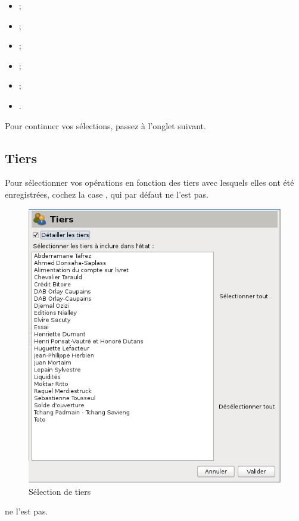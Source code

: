 \begin{itemize}
	  \item {} ;
	  \item {} ;
	  \item {} ;
	  \item {} ;
	  \item {} ;
	  \item {}.
\end{itemize}

Pour continuer vos sélections, passez à l'onglet suivant.


\subsection{Tiers\label{reportscreation-selection-thirdparties}}

Pour sélectionner vos opérations en fonction des tiers avec lesquels elles ont été enregistrées, cochez la case , qui par défaut \ifIllustration ne l'est pas.
\begin{figure}[htbp]
\begin{center}
\includegraphics[scale=0.5]{image/screenshot/reportcreation_datas_thirdparts}
\end{center}
\caption{Sélection de tiers}
\label{reportcreation-datas-thirdparts-img}
\end{figure}
\else ne l'est pas.
\fi

